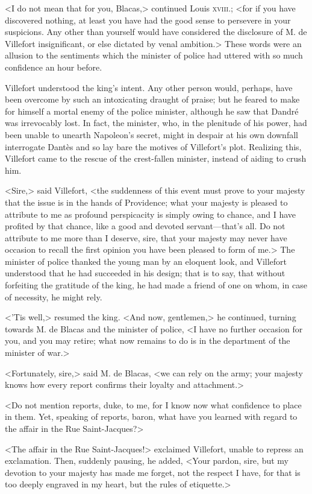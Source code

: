  <I do not mean that for you, Blacas,> continued Louis \textsc{xviii.}; <for if you have discovered nothing, at least you have had the good sense to persevere in your suspicions. Any other than yourself would have considered the disclosure of M. de Villefort insignificant, or else dictated by venal ambition.> These words were an allusion to the sentiments which the minister of police had uttered with so much confidence an hour before. 

 Villefort understood the king's intent. Any other person would, perhaps, have been overcome by such an intoxicating draught of praise; but he feared to make for himself a mortal enemy of the police minister, although he saw that Dandré was irrevocably lost. In fact, the minister, who, in the plenitude of his power, had been unable to unearth Napoleon's secret, might in despair at his own downfall interrogate Dantès and so lay bare the motives of Villefort's plot. Realizing this, Villefort came to the rescue of the crest-fallen minister, instead of aiding to crush him. 

 <Sire,> said Villefort, <the suddenness of this event must prove to your majesty that the issue is in the hands of Providence; what your majesty is pleased to attribute to me as profound perspicacity is simply owing to chance, and I have profited by that chance, like a good and devoted servant—that's all. Do not attribute to me more than I deserve, sire, that your majesty may never have occasion to recall the first opinion you have been pleased to form of me.> The minister of police thanked the young man by an eloquent look, and Villefort understood that he had succeeded in his design; that is to say, that without forfeiting the gratitude of the king, he had made a friend of one on whom, in case of necessity, he might rely. 

 <'Tis well,> resumed the king. <And now, gentlemen,> he continued, turning towards M. de Blacas and the minister of police, <I have no further occasion for you, and you may retire; what now remains to do is in the department of the minister of war.> 

 <Fortunately, sire,> said M. de Blacas, <we can rely on the army; your majesty knows how every report confirms their loyalty and attachment.> 

 <Do not mention reports, duke, to me, for I know now what confidence to place in them. Yet, speaking of reports, baron, what have you learned with regard to the affair in the Rue Saint-Jacques?> 

 <The affair in the Rue Saint-Jacques!> exclaimed Villefort, unable to repress an exclamation. Then, suddenly pausing, he added, <Your pardon, sire, but my devotion to your majesty has made me forget, not the respect I have, for that is too deeply engraved in my heart, but the rules of etiquette.> 

